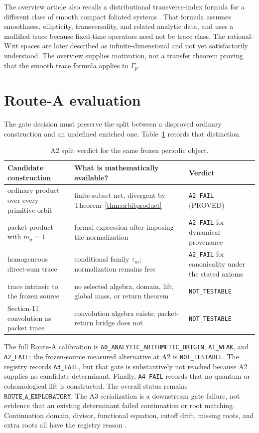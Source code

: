 \documentclass[11pt]{article}
\theoremstyle{definition}
\theoremstyle{remark}
\newcommand{\proved}{\textsf{PROVED}}
\begin{document}
The overview article also recalls a distributional transverse-index formula
for a different class of smooth compact foliated systems
\citep{Deninger2024}.  That formula assumes smoothness, ellipticity,
transversality, and related analytic data, and uses a mollified trace because
fixed-time operators need not be trace class.  The rational-Witt spaces are
later described as infinite-dimensional and not yet satisfactorily
understood.  The overview supplies motivation, not a transfer theorem proving
that the smooth trace formula applies to \(\Gamma_p\).

\section{Route-A evaluation}
\label{sec:route}

The gate decision must preserve the split between a disproved ordinary
construction and an undefined enriched one.  Table~\ref{tab:a2split} records
that distinction.

\begin{table}[ht]
\centering
\caption{A2 split verdict for the same frozen periodic object.}
\label{tab:a2split}
\small
\begin{tabularx}{\textwidth}{p{}X p{}}
\toprule
Candidate construction & What is mathematically available? & Verdict\\
\midrule
ordinary product over every primitive orbit & finite-subset net, divergent by Theorem~\ref{thm:orbitproduct} & \texttt{A2\_FAIL} (\proved)\\
packet product with \(m_p=1\) & formal expression after imposing the normalization & \texttt{A2\_FAIL} for dynamical provenance\\
homogeneous direct-sum trace & conditional family \(\tau_m\); normalization remains free & \texttt{A2\_FAIL} for canonicality under the stated axioms\\
trace intrinsic to the frozen source & no selected algebra, domain, lift, global mass, or return theorem & \texttt{NOT\_TESTABLE}\\
Section-11 convolution as packet trace & convolution algebra exists; packet-return bridge does not & \texttt{NOT\_TESTABLE}\\
\bottomrule
\end{tabularx}
\end{table}

The full Route-A calibration is
\texttt{A0\_ANALYTIC\_ARITHMETIC\_ORIGIN}, \texttt{A1\_WEAK}, and
\texttt{A2\_FAIL}; the frozen-source measured alternative at A2 is
\texttt{NOT\_TESTABLE}.  The registry records \texttt{A3\_FAIL}, but that
gate is substantively not reached because A2 supplies no candidate
determinant.  Finally, \texttt{A4\_FAIL} records that no quantum or
cohomological lift is constructed.
The overall status remains
\(\texttt{ROUTE\_A\_EXPLORATORY}\).  The A3 serialization is a downstream
gate failure, not evidence that an existing determinant failed continuation
or root matching.  Continuation domain, divisor, functional equation,
cutoff drift, missing roots, and extra roots all have the registry reason
.
\end{document}
